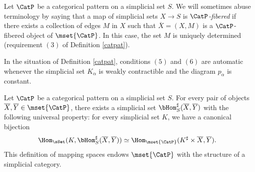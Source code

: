 \begin{remark}\label{caroline}
Let $\CatP$ be a categorical pattern on a simplicial set $S$. We will sometimes abuse terminology by saying that a map of simplicial sets $X \rightarrow S$ is {\it $\CatP$-fibered} if there exists a collection
of edges $M$ in $X$ such that $\overline{X} = (X,M)$ is a $\CatP$-fibered object of $\mset{ \CatP}$.
In this case, the set $M$ is uniquely determined (requirement $(3)$ of Definition \ref{catpat}). 
\end{remark}

\begin{remark}\label{sichwell}
In the situation of Definition \ref{catpat}, conditions $(5)$ and $(6)$ are automatic
whenever the simplicial set $K_{\alpha}$ is weakly contractible and the diagram
$p_{\alpha}$ is constant.
\end{remark}

\begin{remark}
Let $\CatP$ be a categorical pattern on a simplicial set $S$. For every pair of objects $\overline{X}, \overline{Y} \in \mset{ \CatP}$, there exists a simplicial set $\bHom_{S}^{\sharp}( \overline{X}, \overline{Y})$ with the following universal property: for every
simplicial set $K$, we have a canonical bijection
$$ \Hom_{ \sSet}( K, \bHom_{S}^{\sharp}( \overline{X}, \overline{Y} ))
\simeq \Hom_{ \mset{ \CatP}}( K^{\sharp} \times \overline{X}, \overline{Y} ).$$
This definition of mapping spaces endows $\mset{ \CatP}$ with the structure of a
simplicial category.
\end{remark}

